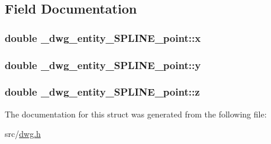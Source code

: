 \subsection{\-Field \-Documentation}
\hypertarget{struct__dwg__entity__SPLINE__point_a212ee51be4b2b1e7818619308b48402b}{
\subsubsection[{x}]{\setlength{\rightskip}{0pt plus 5cm}double {\bf \-\_\-dwg\-\_\-entity\-\_\-\-S\-P\-L\-I\-N\-E\-\_\-point\-::x}}}\label{struct__dwg__entity__SPLINE__point_a212ee51be4b2b1e7818619308b48402b}
\hypertarget{struct__dwg__entity__SPLINE__point_ab78595e943ec135a453aeca105243c56}{
\subsubsection[{y}]{\setlength{\rightskip}{0pt plus 5cm}double {\bf \-\_\-dwg\-\_\-entity\-\_\-\-S\-P\-L\-I\-N\-E\-\_\-point\-::y}}}\label{struct__dwg__entity__SPLINE__point_ab78595e943ec135a453aeca105243c56}
\hypertarget{struct__dwg__entity__SPLINE__point_adf9becc86b3f49e972d2ae9efdd5c839}{
\subsubsection[{z}]{\setlength{\rightskip}{0pt plus 5cm}double {\bf \-\_\-dwg\-\_\-entity\-\_\-\-S\-P\-L\-I\-N\-E\-\_\-point\-::z}}}\label{struct__dwg__entity__SPLINE__point_adf9becc86b3f49e972d2ae9efdd5c839}


\-The documentation for this struct was generated from the following file\-:\begin{DoxyCompactItemize}
\item 
src/\hyperlink{dwg_8h}{dwg.\-h}\end{DoxyCompactItemize}
